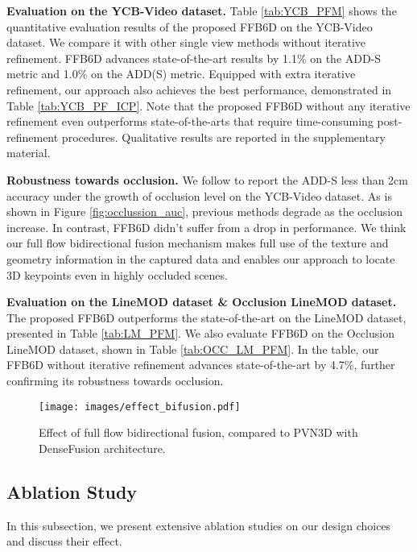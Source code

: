 \textbf{Evaluation on the YCB-Video dataset.} Table \ref{tab:YCB_PFM} shows the quantitative evaluation results of the proposed FFB6D on the YCB-Video dataset. We compare it with other single view methods without iterative refinement. FFB6D advances state-of-the-art results by 1.1\% on the ADD-S metric and 1.0\% on the ADD(S) metric. Equipped with extra iterative refinement, our approach also achieves the best performance, demonstrated in Table \ref{tab:YCB_PF_ICP}. Note that the proposed FFB6D without any iterative refinement even outperforms state-of-the-arts that require time-consuming post-refinement procedures. Qualitative results are reported in the supplementary material. 

\textbf{Robustness towards occlusion.} We follow \cite{wang2019densefusion,he2020pvn3d} to report the ADD-S less than 2cm accuracy under the growth of occlusion level on the YCB-Video dataset. As is shown in Figure \ref{fig:occlussion_auc}, previous methods degrade as the occlusion increase. In contrast, FFB6D didn't suffer from a drop in performance. We think our full flow bidirectional fusion mechanism makes full use of the texture and geometry information in the captured data and enables our approach to locate 3D keypoints even in highly occluded scenes. 

\textbf{Evaluation on the LineMOD dataset \& Occlusion LineMOD dataset.} The proposed FFB6D outperforms the state-of-the-art on the LineMOD dataset, presented in Table \ref{tab:LM_PFM}. We also evaluate FFB6D on the Occlusion LineMOD dataset, shown in Table \ref{tab:OCC_LM_PFM}. In the table, our FFB6D without iterative refinement advances state-of-the-art by 4.7\%, further confirming its robustness towards occlusion.


\begin{figure*}
  \centering
     \texttt{[image: images/effect\_bifusion.pdf]}
     \caption{
         Effect of full flow bidirectional fusion, compared to PVN3D \cite{he2020pvn3d} with DenseFusion architecture.
}
     \label{fig:eff_BiF}
\end{figure*}


\subsection{Ablation Study}
In this subsection, we present extensive ablation studies on our design choices and discuss their effect. 

